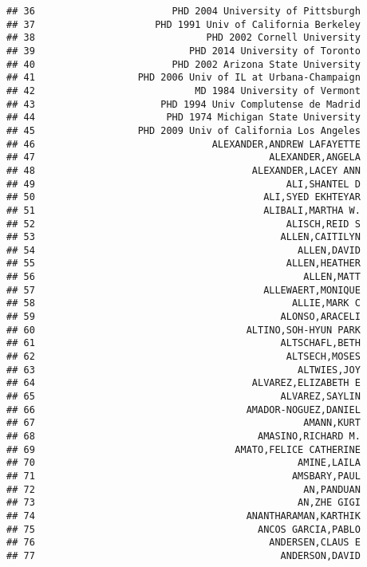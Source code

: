 \documentclass[
]{article}
\begin{document}
\begin{verbatim}
## 36                        PHD 2004 University of Pittsburgh
## 37                     PHD 1991 Univ of California Berkeley
## 38                              PHD 2002 Cornell University
## 39                           PHD 2014 University of Toronto
## 40                        PHD 2002 Arizona State University
## 41                  PHD 2006 Univ of IL at Urbana-Champaign
## 42                            MD 1984 University of Vermont
## 43                      PHD 1994 Univ Complutense de Madrid
## 44                       PHD 1974 Michigan State University
## 45                  PHD 2009 Univ of California Los Angeles
## 46                               ALEXANDER,ANDREW LAFAYETTE
## 47                                         ALEXANDER,ANGELA
## 48                                      ALEXANDER,LACEY ANN
## 49                                            ALI,SHANTEL D
## 50                                        ALI,SYED EKHTEYAR
## 51                                        ALIBALI,MARTHA W.
## 52                                            ALISCH,REID S
## 53                                           ALLEN,CAITILYN
## 54                                              ALLEN,DAVID
## 55                                            ALLEN,HEATHER
## 56                                               ALLEN,MATT
## 57                                        ALLEWAERT,MONIQUE
## 58                                             ALLIE,MARK C
## 59                                           ALONSO,ARACELI
## 60                                     ALTINO,SOH-HYUN PARK
## 61                                           ALTSCHAFL,BETH
## 62                                            ALTSECH,MOSES
## 63                                              ALTWIES,JOY
## 64                                      ALVAREZ,ELIZABETH E
## 65                                           ALVAREZ,SAYLIN
## 66                                     AMADOR-NOGUEZ,DANIEL
## 67                                               AMANN,KURT
## 68                                       AMASINO,RICHARD M.
## 69                                   AMATO,FELICE CATHERINE
## 70                                              AMINE,LAILA
## 71                                             AMSBARY,PAUL
## 72                                               AN,PANDUAN
## 73                                              AN,ZHE GIGI
## 74                                     ANANTHARAMAN,KARTHIK
## 75                                       ANCOS GARCIA,PABLO
## 76                                         ANDERSEN,CLAUS E
## 77                                           ANDERSON,DAVID

\end{verbatim}
\end{document}
